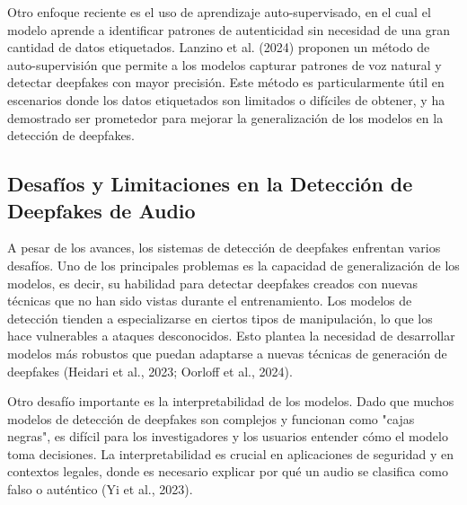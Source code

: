 Otro enfoque reciente es el uso de aprendizaje auto-supervisado, en el cual el modelo aprende a identificar patrones de autenticidad sin necesidad de una gran cantidad de datos etiquetados. Lanzino et al. (2024) proponen un método de auto-supervisión que permite a los modelos capturar patrones de voz natural y detectar deepfakes con mayor precisión. Este método es particularmente útil en escenarios donde los datos etiquetados son limitados o difíciles de obtener, y ha demostrado ser prometedor para mejorar la generalización de los modelos en la detección de deepfakes.

\subsection{Desafíos y Limitaciones en la Detección de Deepfakes de Audio}
A pesar de los avances, los sistemas de detección de deepfakes enfrentan varios desafíos. Uno de los principales problemas es la capacidad de generalización de los modelos, es decir, su habilidad para detectar deepfakes creados con nuevas técnicas que no han sido vistas durante el entrenamiento. Los modelos de detección tienden a especializarse en ciertos tipos de manipulación, lo que los hace vulnerables a ataques desconocidos. Esto plantea la necesidad de desarrollar modelos más robustos que puedan adaptarse a nuevas técnicas de generación de deepfakes (Heidari et al., 2023; Oorloff et al., 2024).

Otro desafío importante es la interpretabilidad de los modelos. Dado que muchos modelos de detección de deepfakes son complejos y funcionan como "cajas negras", es difícil para los investigadores y los usuarios entender cómo el modelo toma decisiones. La interpretabilidad es crucial en aplicaciones de seguridad y en contextos legales, donde es necesario explicar por qué un audio se clasifica como falso o auténtico (Yi et al., 2023).
